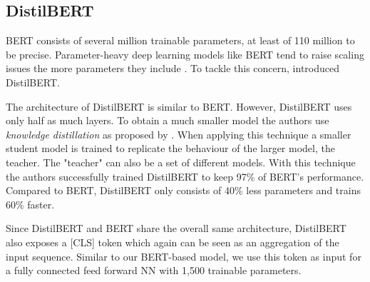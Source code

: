 \subsection{DistilBERT}
\label{chp:approach:sec:models:subsec:distilbert}

\Ac{BERT} consists of several million trainable parameters, at least of 110 million to be precise.
Parameter-heavy deep learning models like \ac{BERT} tend to raise scaling issues the more parameters they include \parencite{Schwartz:2019}.
To tackle this concern, \textcite{Sanh:2019} introduced \acl{DistilBERT}.

The architecture of \ac{DistilBERT} is similar to \ac{BERT}.
However, \ac{DistilBERT} uses only half as much layers.
To obtain a much smaller model the authors use \textit{knowledge distillation} as proposed by \textcites{Bucilua:2006}{Hinton:2015}.
When applying this technique a smaller student model is trained to replicate the behaviour of the larger model, the teacher.
The "teacher" can also be a set of different models.
With this technique the authors successfully trained \ac{DistilBERT} to keep 97\% of \ac{BERT}'s performance.
Compared to \ac{BERT}, \ac{DistilBERT} only consists of 40\% less parameters and trains 60\% faster. \parencite{Sanh:2019}

Since \ac{DistilBERT} and \ac{BERT} share the overall same architecture, \ac{DistilBERT} also exposes a [CLS] token which again can be seen as an aggregation of the input sequence.
Similar to our \ac{BERT}-based model, we use this token as input for a fully connected feed forward \ac{NN} with 1,500 trainable parameters.
